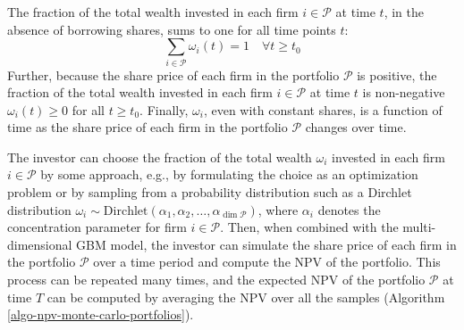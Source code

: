 \documentclass[11pt]{article}
\theoremstyle{definition}
\begin{document}
\begin{concept}\label{concept:properties-of-omega}
The fraction of the total wealth invested in each firm $i\in\mathcal{P}$ at time $t$, in the absence of borrowing shares, sums to one for all time points $t$:
\begin{equation*}
\sum_{i\in\mathcal{P}}\omega_{i}(t) = 1\quad\forall{t\geq{t_{0}}}
\end{equation*}
Further, because the share price of each firm in the portfolio $\mathcal{P}$ is positive, the fraction of the total wealth invested in each firm $i\in\mathcal{P}$ at time $t$ is non-negative $\omega_{i}(t)\geq{0}$ for all $t\geq{t_{0}}$. 
Finally, $\omega_{i}$, even with constant shares, is a function of time as the share price of each firm in the portfolio $\mathcal{P}$ changes over time.
\end{concept}
The investor can choose the fraction of the total wealth $\omega_{i}$ invested in each firm $i\in\mathcal{P}$ by some approach, e.g., by formulating the choice as an optimization problem or by sampling from a probability distribution such as a Dirchlet distribution $\omega_{i}\sim\text{Dirchlet}(\alpha_{1},\alpha_{2},\dots,\alpha_{\dim\mathcal{P}})$, where $\alpha_{i}$ denotes the concentration parameter for firm $i\in\mathcal{P}$. Then, when combined with the multi-dimensional GBM model, the investor can simulate the share price of each firm in the portfolio $\mathcal{P}$ over a time period and compute the NPV of the portfolio. This process can be repeated many times, and the expected NPV of the portfolio $\mathcal{P}$ at time $T$ can be computed by averaging the NPV over all the samples (Algorithm \ref{algo-npv-monte-carlo-portfolios}).
\end{document}
